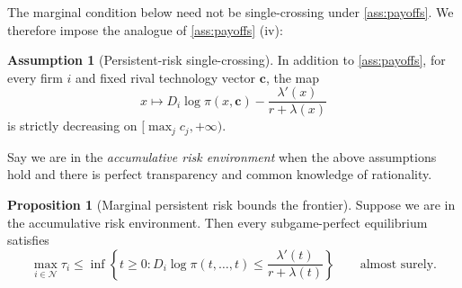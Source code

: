 \documentclass[12pt,reqno]{article}
\theoremstyle{definition} \newtheorem{example}{Example}
\theoremstyle{definition} \newtheorem{condition}{Condition}
\theoremstyle{definition} \newtheorem{corollary}{Corollary}
\theoremstyle{definition} \newtheorem{claim}{Claim}
\theoremstyle{definition} \newtheorem{definition}{Definition}
\theoremstyle{definition} \newtheorem{conjecture}{Conjecture}
\theoremstyle{definition} \newtheorem{Lemma}{Lemma}
\theoremstyle{definition} \newtheorem{lemma}{Lemma}
\theoremstyle{plain} \newtheorem{theorem}{Theorem}
\theoremstyle{definition} \newtheorem{assumption}{Assumption}
\theoremstyle{definition} \newtheorem*{assumptionnonumber}{Assumption}
\theoremstyle{definition} \newtheorem*{theoremNoNumber}{Proposition}
\theoremstyle{definition}
\theoremstyle{definition}\newtheorem{proposition}{Proposition}
\theoremstyle{definition} \newtheorem{result}{Result}
\theoremstyle{definition} \newtheorem*{definitionNoNumber}{Definition}
\theoremstyle{definition} \newtheorem{Definition}{Definition}
\theoremstyle{definition} \newtheorem*{DefinitionNoNumber}{Definition}
\theoremstyle{definition} \newtheorem*{fact}{Fact}
\theoremstyle{definition} \newtheorem*{property}{Property}
\theoremstyle{definition} \newtheorem{remark}{Remark}
\begin{document}
The marginal condition below need not be single-crossing under
\cref{ass:payoffs}. We therefore impose the analogue of \ref{ass:payoffs} (iv):

\begin{assumption}[Persistent-risk single-crossing]
\label{ass:persistent-sc}
In addition to \cref{ass:payoffs}, for every firm $i$ and fixed rival
technology vector $\bm c$, the map
\[
x\longmapsto
D_i\log\pi(x,\bm c)
-\frac{\lambda'(x)}{r+\lambda(x)}
\]
is strictly decreasing on $[\max_j c_j,+\infty)$.
\end{assumption}

Say we are in the \emph{accumulative risk environment} when the above assumptions hold and there is perfect transparency and common knowledge of rationality.



\begin{proposition}[Marginal persistent risk bounds the frontier]
\label{prop:persistent-upper}
Suppose we are in the accumulative risk environment. Then every subgame-perfect equilibrium satisfies
\[
\max_{i\in\mathcal N}\tau_i
\leq
\inf\left\{
t\geq0:
D_i\log\pi(t,\ldots,t)
\leq
\frac{\lambda'(t)}{r+\lambda(t)}
\right\}
\qquad\text{almost surely}.
\]
\end{proposition}
\end{document}
